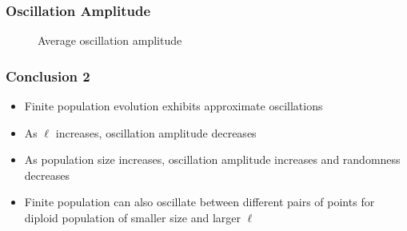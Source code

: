 \documentclass[aspectratio=169]{beamer}
\begin{document}
  
  \begin{frame}
    \frametitle{Oscillation Amplitude}
    \begin{figure}[h]
      \begin{center}
	 \vspace{-0.5em} %
	\caption[]{Average oscillation amplitude} 
      \end{center}
    \end{figure}
  \end{frame}
  
  
  \begin{frame}
    \frametitle{Conclusion 2}
    \begin{itemize}
      \item{Finite population evolution exhibits approximate oscillations}    
      \item{As $\ell$ increases, oscillation amplitude decreases}
      \item{As population size increases, oscillation amplitude increases and randomness decreases}
      \item{Finite population can also oscillate between different pairs of points for diploid population of smaller size and larger $\ell$ }
    \end{itemize}
  \end{frame}
  
\end{document}
